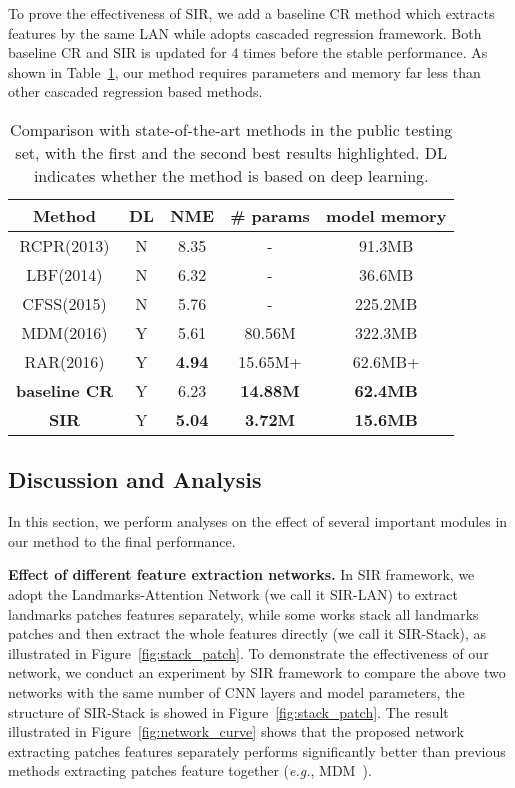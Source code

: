 \documentclass[letterpaper]{article} \usepackage{aaai18}  \usepackage{times}  \usepackage{helvet}  \usepackage{courier}  \usepackage{url}  \usepackage{graphicx}
\def\eg{{\em e.g.}}
\begin{document}
To prove the effectiveness of SIR, we add a baseline CR method which extracts features by the same LAN while adopts cascaded regression framework. Both baseline CR and SIR is updated for 4 times before the stable performance. As shown in Table~\ref{tab:parameters}, our method requires parameters and memory far less than other cascaded regression based methods.



\begin{table}[h]
\centering
\caption {Comparison with state-of-the-art methods in the  public testing set, with the first and the second best results highlighted. DL indicates whether the method is based on deep learning.}
\label{tab:parameters}
\footnotesize{
\begin{tabular}{c c c c c}
\hline
Method & DL & NME & \# params & model memory\\
\hline
RCPR(2013) & N & 8.35 & - & 91.3MB\\
LBF(2014) & N & 6.32& - & 36.6MB \\
CFSS(2015) & N & 5.76 & - & 225.2MB\\
MDM(2016) & Y & 5.61 & 80.56M & 322.3MB \\
RAR(2016) & Y & \textbf{4.94} & 15.65M+  & 62.6MB+\\
\hline
\textbf{baseline CR} & Y &  6.23 & \textbf{14.88M} & \textbf{62.4MB} \\
\textbf{SIR} & Y & \textbf{5.04} & \textbf{3.72M} & \textbf{15.6MB}\\
\hline
\end{tabular}}
\end{table}

\subsection{Discussion and Analysis}\label{sec:discussion}
In this section, we perform analyses on the effect of several important modules in our method to the final performance.

{\noindent \textbf{Effect of different feature extraction networks.}} In SIR framework, we adopt the Landmarks-Attention Network (we call it SIR-LAN) to extract landmarks patches features separately, while some works stack all landmarks patches and then extract the whole features directly (we call it SIR-Stack), as illustrated in Figure~\ref{fig:stack_patch}. To demonstrate the effectiveness of our network, we conduct an experiment by SIR framework to compare the above two networks with the same number of CNN layers and model parameters, the structure of SIR-Stack is showed in Figure~\ref{fig:stack_patch}. The result illustrated in Figure~\ref{fig:network_curve} shows that the proposed network extracting patches features separately performs significantly better than previous methods extracting patches feature together (\eg, MDM~\cite{Trigeorgis:MDM:CVPR16}).
\end{document}
